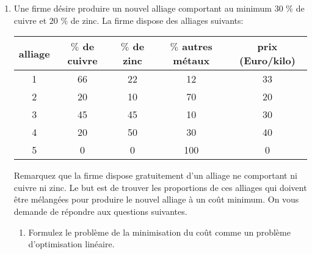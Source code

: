 \begin{enumerate}
    \begin{enumerate}
      \item  Formulez le problème de la maximisation du profit comme un problème d'optimisation linéaire. Résolvez le problème.

      \item Trouvez la formulation  duale de ce problème. Soit $y_*$ une solution optimale du dual. Proposez une interprétation pour les
        différentes composantes de
        $y_*$.

      \item   L'université a-t-elle avantage a recruter des professeurs supplémentaires pour 10000 EUR par professeur et par an?

      \item L'université engage des professeurs supplémentaires à 8000 EUR par an. Combien de professeurs a-t-elle avantage \`a engager?

    \end{enumerate}


    \begin{solution}
      \nosolution
    \end{solution}

  \item  Une firme d\'esire produire un nouvel alliage comportant au minimum
    30 $\%$ de cuivre et 20 $\%$ de zinc. La firme dispose des alliages suivants:

    \begin{tabular}{|c|c|c|c|c|}
      \hline
      alliage &  $\%$ de cuivre & $\%$ de zinc & $\%$ autres m\'etaux & prix (Euro/kilo) \\
      \hline
      1 & 66 & 22 & 12 & 33 \\
      \hline
      2 & 20 & 10 & 70 & 20 \\
      \hline
      3 & 45 & 45 & 10 & 30 \\
      \hline
      4 & 20 & 50  & 30 & 40\\
      \hline
      5 & 0 & 0 & 100 & 0 \\
      \hline
    \end{tabular}


    Remarquez que la firme dispose gratuitement d'un alliage ne comportant ni cuivre ni zinc.
    Le but est de trouver les proportions de ces alliages qui doivent
    \^etre m\'elang\'ees  pour produire le nouvel alliage \`a un co\^ut minimum. On vous demande de r\'epondre aux questions suivantes.

    \begin{enumerate}
      \item  Formulez le probl\`eme de la minimisation du co\^ut comme un probl\`eme
        d'optimisation lin\'eaire.


\end{enumerate}
\end{enumerate}
